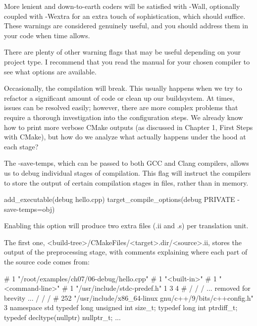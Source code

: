 More lenient and down-to-earth coders will be satisfied with -Wall, optionally coupled with -Wextra for an extra touch of sophistication, which should suffice. These warnings are considered genuinely useful, and you should address them in your code when time allows.

There are plenty of other warning flags that may be useful depending on your project type. I recommend that you read the manual for your chosen compiler to see what options are available.


Occasionally, the compilation will break. This usually happens when we try to refactor a significant amount of code or clean up our buildsystem. At times, issues can be resolved easily; however, there are more complex problems that require a thorough investigation into the configuration steps. We already know how to print more verbose CMake outputs (as discussed in Chapter 1, First Steps with CMake), but how do we analyze what actually happens under the hood at each stage?


The -save-temps, which can be passed to both GCC and Clang compilers, allows us to debug individual stages of compilation. This flag will instruct the compilers to store the output of certain compilation stages in files, rather than in memory.


\begin{cmake}
add_executable(debug hello.cpp)
target_compile_options(debug PRIVATE -save-temps=obj)
\end{cmake}

Enabling this option will produce two extra files (.ii and .s) per translation unit.

The first one, <build-tree>/CMakeFiles/<target>.dir/<source>.ii, stores the output of the preprocessing stage, with comments explaining where each part of the source code comes from:

\begin{shell}
# 1 "/root/examples/ch07/06-debug/hello.cpp"
# 1 "<built-in>"
# 1 "<command-line>"
# 1 "/usr/include/stdc-predef.h" 1 3 4
# / / / ... removed for brevity ... / / /
# 252 "/usr/include/x86_64-linux
  gnu/c++/9/bits/c++config.h" 3
namespace std
{
    typedef long unsigned int size_t;
    typedef long int ptrdiff_t;
    typedef decltype(nullptr) nullptr_t;
}
...
\end{shell}

